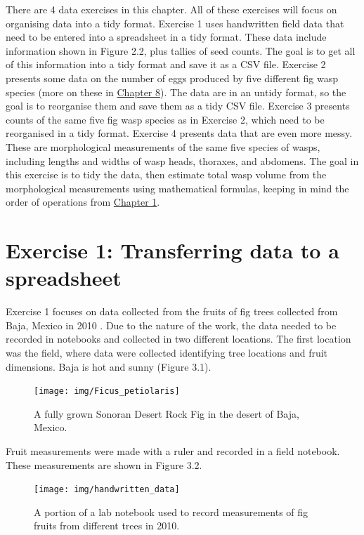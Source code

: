 \documentclass[
  openany]{krantz}
\begin{document}
There are 4 data exercises in this chapter.
All of these exercises will focus on organising data into a tidy format.
Exercise 1 uses handwritten field data that need to be entered into a spreadsheet in a tidy format.
These data include information shown in Figure 2.2, plus tallies of seed counts.
The goal is to get all of this information into a tidy format and save it as a CSV file.
Exercise 2 presents some data on the number of eggs produced by five different fig wasp species (more on these in \protect\hyperlink{Chapter_8}{Chapter 8}).
The data are in an untidy format, so the goal is to reorganise them and save them as a tidy CSV file.
Exercise 3 presents counts of the same five fig wasp species as in Exercise 2, which need to be reorganised in a tidy format.
Exercise 4 presents data that are even more messy.
These are morphological measurements of the same five species of wasps, including lengths and widths of wasp heads, thoraxes, and abdomens.
The goal in this exercise is to tidy the data, then estimate total wasp volume from the morphological measurements using mathematical formulas, keeping in mind the order of operations from \protect\hyperlink{Chapter_1}{Chapter 1}.

\hypertarget{exercise-1-transferring-data-to-a-spreadsheet}{%
\section{Exercise 1: Transferring data to a spreadsheet}\label{exercise-1-transferring-data-to-a-spreadsheet}}

Exercise 1 focuses on data collected from the fruits of fig trees collected from Baja, Mexico in 2010 \citep{Duthie2015b, Duthie2016}.
Due to the nature of the work, the data needed to be recorded in notebooks and collected in two different locations.
The first location was the field, where data were collected identifying tree locations and fruit dimensions.
Baja is hot and sunny (Figure 3.1).

\begin{figure}
\texttt{[image: img/Ficus\_petiolaris]} \caption{A fully grown Sonoran Desert Rock Fig in the desert of Baja, Mexico.}\label{fig:unnamed-chunk-9}
\end{figure}

Fruit measurements were made with a ruler and recorded in a field notebook.
These measurements are shown in Figure 3.2.

\begin{figure}
\texttt{[image: img/handwritten\_data]} \caption{A portion of a lab notebook used to record measurements of fig fruits from different trees in 2010.}\label{fig:unnamed-chunk-10}
\end{figure}
\end{document}
